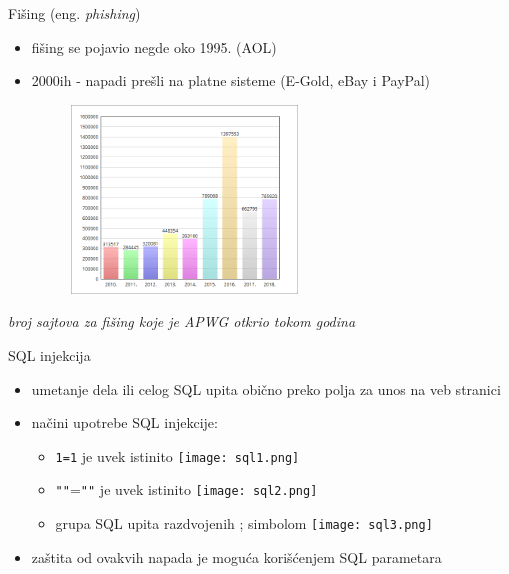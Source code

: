     \begin{frame}{Fišing (eng. \textit{phishing})}
        \begin{minipage}{\textwidth}
        \begin{itemize}
                \item fišing se pojavio negde oko 1995. (AOL)
                \item 2000ih - napadi prešli na platne sisteme (E-Gold, eBay i PayPal)
            \end{itemize}
        \end{minipage}
        
        \begin{minipage}{\textwidth}
            \centering
            \vspace{0.3cm}
            \includegraphics[width=0.7\textwidth, height = 5cm]{images/phishing.png}
        \end{minipage}
        \begin{minipage}{\textwidth}
            \centering
            \textit{broj sajtova za fišing koje je APWG otkrio tokom godina}
        \end{minipage}
    \end{frame}

\begin{frame}{SQL injekcija}
        
            \begin{itemize}
                \item umetanje dela ili celog SQL upita obično preko polja za unos na veb stranici
                \item načini upotrebe SQL injekcije:
                		\begin{itemize}
                		\item \texttt{1=1} je uvek istinito
                		        \texttt{[image: sql1.png]}
                		\item \texttt{"}\texttt{"}=\texttt{"}\texttt{"} je uvek istinito
                		        \texttt{[image: sql2.png]}                		        
                		\item grupa SQL upita razdvojenih ; simbolom
                		        \texttt{[image: sql3.png]}
                		\end{itemize}
                	\item zaštita od ovakvih napada je moguća korišćenjem SQL parametara
            \end{itemize}
    \end{frame}


